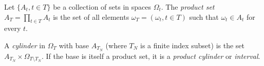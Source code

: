 Let $\{A_t, t \in T\}$ be a collection of sets in spaces $\Omega_t$. The \textit{product set} $A_T = \prod_{t \in T} A_t$ is the set of all elements $\omega_T = (\omega_t, t \in T)$ such that $\omega_t \in A_t$ for every $t$.

A \textit{cylinder} in $\Omega_T$ with base $A_{T_N}$ (where $T_N$ is a finite index subset) is the set $A_{T_N} \times \Omega_{T \setminus T_N}$. If the base is itself a product set, it is a \textit{product cylinder} or \textit{interval}.

